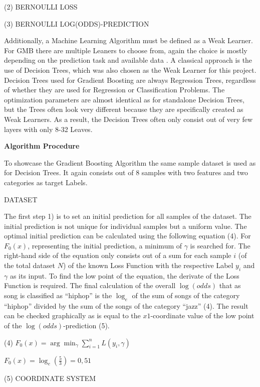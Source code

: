 (2) BERNOULLI LOSS 

(3) BERNOULLI LOG(ODDS)-PREDICTION 

Additionally, a Machine Learning Algorithm must be defined as a Weak Learner. For GMB there 
are multiple Leaners to choose from, again the choice is mostly depending on the prediction 
task and available data \cite[3.2]{Natekin2013}. A classical approach is the use of Decision Trees, which was also 
chosen as the Weak Learner for this project. Decision Trees used for Gradient Boosting are 
always Regression Trees, regardless of whether they are used for Regression or Classification 
Problems. The optimization parameters are almost identical as for standalone Decision Trees, 
but the Trees often look very different because they are specifically created as Weak Learners. 
As a result, the Decision Trees often only consist out of very few layers with only 8-32 Leaves.

\textbf{Algorithm Procedure}

To showcase the Gradient Boosting Algorithm the same sample dataset is used as for Decision Trees. 
It again consists out of 8 samples with two features and two categories as target Labels. 

DATASET 

The first step 1) is to set an initial prediction for all samples of the dataset. The initial 
prediction is not unique for individual samples but a uniform value. The optimal initial 
prediction can be calculated using the following equation (4). For \(F_{0}(x)\), representing the 
initial prediction, a minimum of \(\gamma \) is searched for. The right-hand side of the equation 
only consists out of a sum for each sample \(i\) (of the total dataset \(N\)) of the known Loss Function 
with the respective Label \(y_{i}\) and \(\gamma \) as its input. To find the low point of the equation, 
the derivate of the Loss Function is required. The final calculation of the overall \(\log (odds)\) 
that as song is classified as “hiphop” is the \(\log_{e}\) of the sum of songs of the category “hiphop” 
divided by the sum of the songs of the category “jazz” (4). The result can be checked graphically 
as is equal to the \(x1\)-coordinate value of the low point of the \(\log (odds)\)-prediction (5). 

(4) \(F_{0}(x) = \arg \min_{\gamma } \sum_{i= 1}^{n} L(y_{i}, \gamma) \)

\(F_{0}(x) = \log_{e}(\frac{5}{3}) = 0,51\)

(5) COORDINATE SYSTEM

